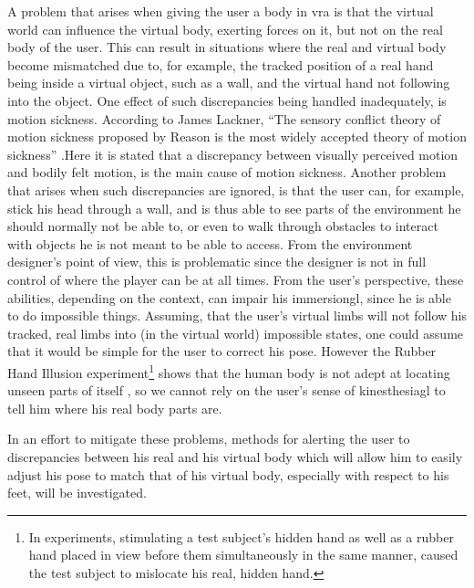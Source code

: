 A problem that arises when giving the user a body in \gls{vra} is that the virtual world can influence the virtual body, exerting forces on it, but not on the real body of the user. This can result in situations where the real and virtual body become mismatched due to, for example, the tracked position of a real hand being inside a virtual object, such as a wall, and the virtual hand not following into the object.
\newline
One effect of such discrepancies being handled inadequately, is motion sickness. According to James Lackner, \enquote{The sensory conflict theory of motion sickness proposed by Reason \textelp{} is the most widely accepted theory of motion sickness} \autocite[p. ~11]{motionSickness}.Here it is stated that a discrepancy between visually perceived motion and bodily felt motion, is the main cause of motion sickness.
\newline
Another problem that arises when such discrepancies are ignored, is that the user can, for example, stick his head through a wall, and is thus able to see parts of the environment he should normally not be able to, or even to walk through obstacles to interact with objects he is not meant to be able to access. From the environment designer's point of view, this is problematic since the designer is not in full control of where the player can be at all times. From the user's perspective, these abilities, depending on the context, can impair his \gls{immersiongl}, since he is able to do impossible things.
\newline
Assuming, that the user's virtual limbs will not follow his tracked, real limbs into (in the virtual world) impossible states, one could assume that it would be simple for the user to correct his pose. However the Rubber Hand Illusion experiment\footnote{In experiments, stimulating a test subject's hidden hand as well as a rubber hand placed in view before them simultaneously in the same manner, caused the test subject to mislocate his real, hidden hand.} shows that the human body is not adept at locating unseen parts of itself \autocite{rubberHandsFeel}, so we cannot rely on the user's sense of \gls{kinesthesiagl} to tell him where his real body parts are.
\newline

In an effort to mitigate these problems, methods for alerting the user to discrepancies between his real and his virtual body which will allow him to easily adjust his pose to match that of his virtual body, especially with respect to his feet, will be investigated. 

